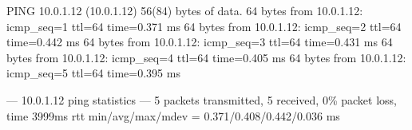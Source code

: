 PING 10.0.1.12 (10.0.1.12) 56(84) bytes of data.
64 bytes from 10.0.1.12: icmp_seq=1 ttl=64 time=0.371 ms
64 bytes from 10.0.1.12: icmp_seq=2 ttl=64 time=0.442 ms
64 bytes from 10.0.1.12: icmp_seq=3 ttl=64 time=0.431 ms
64 bytes from 10.0.1.12: icmp_seq=4 ttl=64 time=0.405 ms
64 bytes from 10.0.1.12: icmp_seq=5 ttl=64 time=0.395 ms

--- 10.0.1.12 ping statistics ---
5 packets transmitted, 5 received, 0\% packet loss, time 3999ms
rtt min/avg/max/mdev = 0.371/0.408/0.442/0.036 ms
